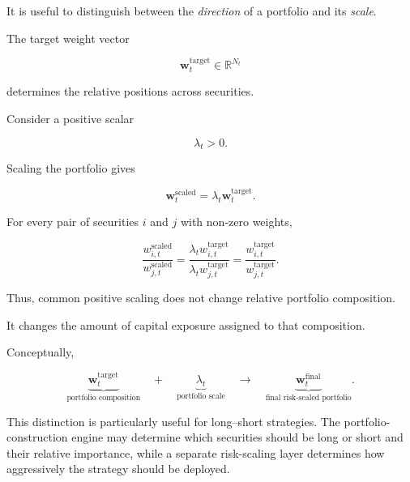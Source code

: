 \documentclass[11pt,a4paper]{article}
\begin{document}
It is useful to distinguish between the \emph{direction} of a portfolio and its
\emph{scale}.

The target weight vector

\begin{equation}
\mathbf{w}_t^{\mathrm{target}}
\in
\mathbb{R}^{N_t}
\end{equation}

determines the relative positions across securities.

Consider a positive scalar

\begin{equation}
\lambda_t>0.
\end{equation}

Scaling the portfolio gives

\begin{equation}
\boxed{
\mathbf{w}_t^{\mathrm{scaled}}
=
\lambda_t
\mathbf{w}_t^{\mathrm{target}}.
}
\end{equation}

For every pair of securities $i$ and $j$ with non-zero weights,

\begin{equation}
\frac{
w_{i,t}^{\mathrm{scaled}}
}{
w_{j,t}^{\mathrm{scaled}}
}
=
\frac{
\lambda_t w_{i,t}^{\mathrm{target}}
}{
\lambda_t w_{j,t}^{\mathrm{target}}
}
=
\frac{
w_{i,t}^{\mathrm{target}}
}{
w_{j,t}^{\mathrm{target}}
}.
\end{equation}

Thus, common positive scaling does not change relative portfolio composition.

It changes the amount of capital exposure assigned to that composition.

Conceptually,

\begin{equation}
\boxed{
\underbrace{
\mathbf{w}_t^{\mathrm{target}}
}_{\text{portfolio composition}}
\quad+\quad
\underbrace{
\lambda_t
}_{\text{portfolio scale}}
\quad\longrightarrow\quad
\underbrace{
\mathbf{w}_t^{\mathrm{final}}
}_{\text{final risk-scaled portfolio}}.
}
\end{equation}

This distinction is particularly useful for long--short strategies. The
portfolio-construction engine may determine which securities should be long or
short and their relative importance, while a separate risk-scaling layer
determines how aggressively the strategy should be deployed.


\end{document}

